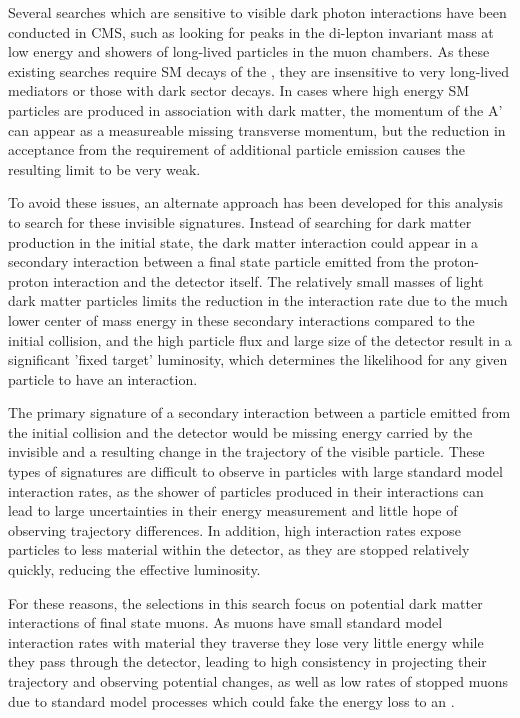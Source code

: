 Several searches which are sensitive to visible dark photon interactions have been conducted in CMS, such as looking for peaks in the di-lepton invariant mass at low energy and showers of long-lived particles in the muon chambers.
As these existing searches require SM decays of the \aprime, they are insensitive to very long-lived mediators or those with dark sector decays.
In cases where high energy SM particles are produced in association with dark matter, the momentum of the A' can appear as a measureable missing transverse momentum, but the reduction in acceptance from the requirement of additional particle emission causes the resulting limit to be very weak.

To avoid these issues, an alternate approach has been developed for this analysis to search for these invisible signatures.
Instead of searching for dark matter production in the initial state, the dark matter interaction could appear in a secondary interaction between a final state particle emitted from the proton-proton interaction and the detector itself.
The relatively small masses of light dark matter particles limits the reduction in the interaction rate due to the much lower center of mass energy in these secondary interactions compared to the initial collision, and the high particle flux and large size of the detector result in a significant 'fixed target' luminosity, which determines the likelihood for any given particle to have an interaction.

The primary signature of a secondary interaction between a particle emitted from the initial collision and the detector would be missing energy carried by the invisible \aprime and a resulting change in the trajectory of the visible particle.
These types of signatures are difficult to observe in particles with large standard model interaction rates, as the shower of particles produced in their interactions can lead to large uncertainties in their energy measurement and little hope of observing trajectory differences.
In addition, high interaction rates expose particles to less material within the detector, as they are stopped relatively quickly, reducing the effective luminosity.

For these reasons, the selections in this search focus on potential dark matter interactions of final state muons.
As muons have small standard model interaction rates with material they traverse they lose very little energy while they pass through the detector, leading to high consistency in projecting their trajectory and observing potential changes, as well as low rates of stopped muons due to standard model processes which could fake the energy loss to an \aprime.

